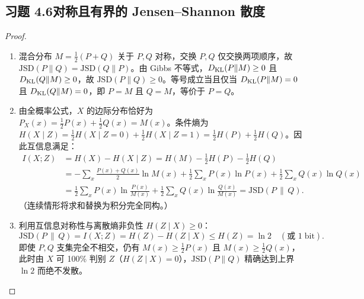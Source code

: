 \subsection*{习题 4.6\quad 对称且有界的 Jensen--Shannon 散度}
\begin{proof}
\begin{enumerate}[label=(\arabic*), leftmargin=1.8em]
  \item 混合分布 $M = \frac{1}{2}(P + Q)$ 关于 $P, Q$ 对称，交换 $P, Q$ 仅交换两项顺序，故 $\mathrm{JSD}(P\|Q) = \mathrm{JSD}(Q\|P)$。由 Gibbs 不等式，$D_{\mathrm{KL}}(P\|M) \ge 0$ 且 $D_{\mathrm{KL}}(Q\|M) \ge 0$，故 $\mathrm{JSD}(P\|Q) \ge 0$。等号成立当且仅当 $D_{\mathrm{KL}}(P\|M) = 0$ 且 $D_{\mathrm{KL}}(Q\|M) = 0$，即 $P = M$ 且 $Q = M$，等价于 $P = Q$。
  \item 由全概率公式，$X$ 的边际分布恰好为 $P_X(x) = \frac{1}{2}P(x) + \frac{1}{2}Q(x) = M(x)$。条件熵为 $H(X \mid Z) = \frac{1}{2}H(X\mid Z=0) + \frac{1}{2}H(X\mid Z=1) = \frac{1}{2}H(P) + \frac{1}{2}H(Q)$。因此互信息满足：
  \begin{align*}
    I(X; Z) &= H(X) - H(X \mid Z) = H(M) - \frac{1}{2}H(P) - \frac{1}{2}H(Q) \\
    &= -\sum_x \frac{P(x)+Q(x)}{2}\ln M(x) + \frac{1}{2}\sum_x P(x)\ln P(x) + \frac{1}{2}\sum_x Q(x)\ln Q(x) \\
    &= \frac{1}{2}\sum_x P(x)\ln\frac{P(x)}{M(x)} + \frac{1}{2}\sum_x Q(x)\ln\frac{Q(x)}{M(x)}
     = \mathrm{JSD}(P \,\|\, Q).
  \end{align*}
  （连续情形将求和替换为积分完全同构。）
  \item 利用互信息对称性与离散熵非负性 $H(Z \mid X) \ge 0$：
  \[
    \mathrm{JSD}(P \,\|\, Q) = I(X; Z) = H(Z) - H(Z \mid X) \le H(Z) = \ln 2 \quad (\text{或 } 1\;\text{bit}).
  \]
  即使 $P, Q$ 支集完全不相交，仍有 $M(x) \ge \frac{1}{2}P(x)$ 且 $M(x) \ge \frac{1}{2}Q(x)$，此时由 $X$ 可 100\% 判别 $Z$（$H(Z\mid X)=0$），$\mathrm{JSD}(P\|Q)$ 精确达到上界 $\ln 2$ 而绝不发散。
\end{enumerate}
\end{proof}


